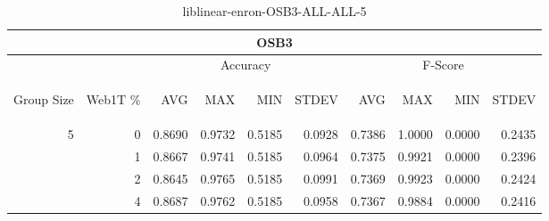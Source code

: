 \begin{center}
\begin{table}[htbp]
\begin{tabular}{ | r | r | r | r | r | r | r | r | r | r |}
\hline
\multicolumn{10}{|c|}{OSB3}\\
\hline
 & & \multicolumn{4}{|c|}{Accuracy} & \multicolumn{4}{|c|}{F-Score}\\ \cline{3-10}
\begin{sideways}Group Size\end{sideways} & \begin{sideways}Web1T \%\end{sideways} & \begin{sideways}AVG\end{sideways} & \begin{sideways}MAX\end{sideways} & \begin{sideways}MIN\end{sideways} & \begin{sideways}STDEV\end{sideways} & \begin{sideways}AVG\end{sideways} & \begin{sideways}MAX\end{sideways} & \begin{sideways}MIN\end{sideways} & \begin{sideways}STDEV\end{sideways}\\
\hline
\multirow{3}{*}{5}
 & 0 & 0.8690 & 0.9732 & 0.5185 & 0.0928 & 0.7386 & 1.0000 & 0.0000 & 0.2435\\ \cline{2-10}
 & 1 & 0.8667 & 0.9741 & 0.5185 & 0.0964 & 0.7375 & 0.9921 & 0.0000 & 0.2396\\ \cline{2-10}
 & 2 & 0.8645 & 0.9765 & 0.5185 & 0.0991 & 0.7369 & 0.9923 & 0.0000 & 0.2424\\ \cline{2-10}
 & 4 & 0.8687 & 0.9762 & 0.5185 & 0.0958 & 0.7367 & 0.9884 & 0.0000 & 0.2416\\ \cline{2-10}
\hline
\end{tabular}
\caption{liblinear-enron-OSB3-ALL-ALL-5}
\label{table:liblinear-enron-OSB3-ALL-ALL-5}
\end{table}
\end{center}


